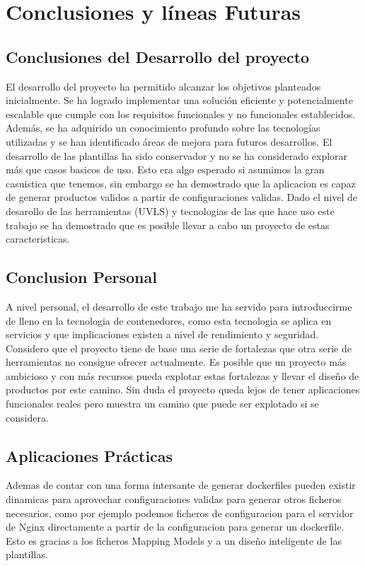 \documentclass[12pt, a4paper, twoside]{article}
\begin{document}
\section{Conclusiones y líneas Futuras }
\label{sec:Conclusiones}


\subsection{Conclusiones del Desarrollo del proyecto}
El desarrollo del proyecto ha permitido alcanzar los objetivos planteados inicialmente. Se ha logrado implementar una solución eficiente y potencialmente escalable que cumple con los requisitos funcionales y no funcionales establecidos. Además, se ha adquirido un conocimiento profundo sobre las tecnologías utilizadas y se han identificado áreas de mejora para futuros desarrollos.
El desarrollo de las plantillas ha sido conservador y no se ha considerado explorar más que casos basicos de uso. Esto era algo esperado si asumimos la gran casuistica que tenemos, sin embargo se ha demostrado que la aplicacion es capaz de generar productos validos a partir de configuraciones validas. Dado el nivel de desarollo de las herramientas (UVLS) y tecnologias de las que hace uso este trabajo se ha demostrado que es posible llevar a cabo un proyecto de estas caracteristicas.
\subsection{Conclusion Personal}
A nivel personal, el desarrollo de este trabajo me ha servido para introduccirme de lleno en la tecnologia de contenedores, como esta tecnologia se aplica en servicios y que implicaciones existen a nivel de rendimiento y seguridad. Considero que el proyecto tiene de base una serie de fortalezas que otra serie de herramientas no consigue ofrecer actualmente. Es posible que un proyecto más ambicioso y con más recursos pueda explotar estas fortalezas y llevar el diseño de productos por este camino.
Sin duda el proyecto queda lejos de tener aplicaciones funcionales reales pero muestra un camino que puede ser explotado si se considera. 
\subsection{Aplicaciones Prácticas}
Ademas de contar con una forma intersante de generar dockerfiles pueden existir dinamicas para aprovechar configuraciones validas para generar otros ficheros necesarios, como por ejemplo podemos ficheros de configuracion para el servidor de Nginx \cite{nginx} directamente a partir de la configuracion para generar un dockerfile. 
Esto es gracias a los ficheros Mapping Models y a un diseño inteligente de las plantillas.
\end{document}
